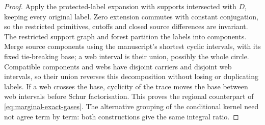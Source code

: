 \documentclass[11pt]{article}
\begin{document}
\begin{proof}
Apply the protected-label expansion with supports intersected with $D$, keeping every original label. Zero extension commutes with constant conjugation, so the restricted primitives, cutoffs and closed source differences are invariant. The restricted support graph and forest partition the labels into components. Merge source components using the manuscript's shortest cyclic intervals, with its fixed tie-breaking base; a web interval is their union, possibly the whole circle. Compatible components and webs have disjoint carriers and disjoint web intervals, so their union reverses this decomposition without losing or duplicating labels. If a web crosses the base, cyclicity of the trace moves the base between web intervals before Schur factorisation. This proves the regional counterpart of \eqref{eq:marginal-exact-gases}. The alternative grouping of the conditional kernel need not agree term by term: both constructions give the same integral ratio.


\end{proof}
\end{document}
